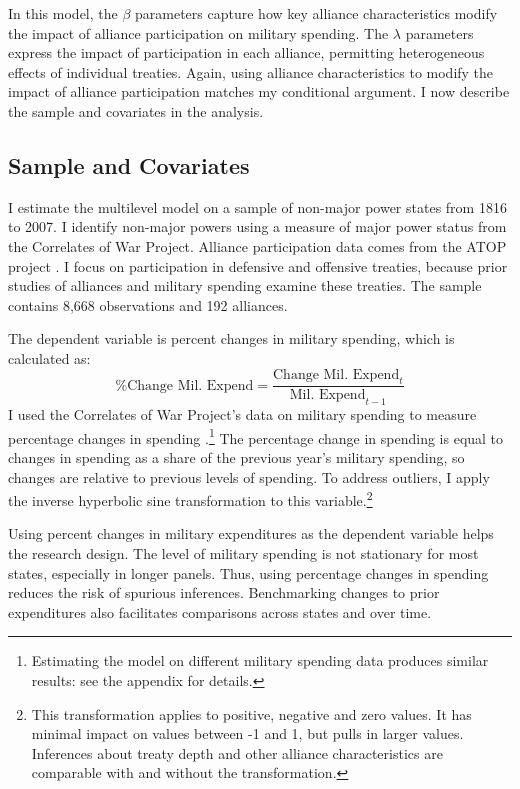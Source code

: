 \documentclass[12pt]{article}
\begin{document}
In this model, the $\beta$ parameters capture how key alliance characteristics modify the impact of alliance participation on military spending. 
The $\lambda$ parameters express the impact of participation in each alliance, permitting heterogeneous effects of individual treaties. 
Again, using alliance characteristics to modify the impact of alliance participation matches my conditional argument. 
I now describe the sample and covariates in the analysis.  



\subsection{Sample and Covariates} 

I estimate the multilevel model on a sample of non-major power states from 1816 to 2007. 
I identify non-major powers using a measure of major power status from the Correlates of War Project. 
Alliance participation data comes from the ATOP project \citep{Leedsetal2002}.  
I focus on participation in defensive and offensive treaties, because prior studies of alliances and military spending examine these treaties. 
The sample contains 8,668 observations and 192 alliances. 


The dependent variable is percent changes in military spending, which is calculated as:
\begin{equation}
\mbox{\% Change Mil. Expend} = \frac{ \mbox{Change Mil. Expend}_t }{ \mbox{Mil. Expend}_{t-1} }
\end{equation} 
I used the Correlates of War Project's data on military spending to measure percentage changes in spending \citep{SingerCINC1988}.\footnote{Estimating the model on different military spending data produces similar results: see the appendix for details.} 
The percentage change in spending is equal to changes in spending as a share of the previous year's military spending, so changes are relative to previous levels of spending. 
To address outliers, I apply the inverse hyperbolic sine transformation to this variable.\footnote{This transformation applies to positive, negative and zero values. It has minimal impact on values between -1 and 1, but pulls in larger values. Inferences about treaty depth and other alliance characteristics are comparable with and without the transformation.}


Using percent changes in military expenditures as the dependent variable helps the research design. 
The level of military spending is not stationary for most states, especially in longer panels. 
Thus, using percentage changes in spending reduces the risk of spurious inferences.
Benchmarking changes to prior expenditures also facilitates comparisons across states and over time. 
\end{document}
